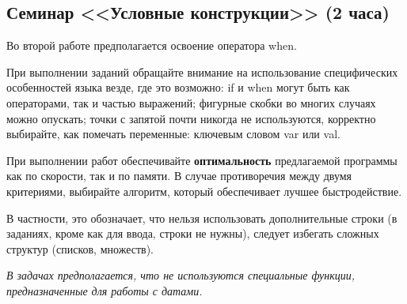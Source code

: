 \subsection{Семинар <<Условные конструкции>> (2 часа)}

Во второй работе предполагается освоение оператора when.

При выполнении заданий обращайте внимание на использование специфических особенностей языка везде, где это возможно: 
if и when могут быть как операторами, так и частью выражений; фигурные скобки во многих случаях можно опускать;
точки с запятой почти никогда не используются, корректно выбирайте, как помечать переменные: ключевым словом var или val.

При выполнении работ обеспечивайте \textbf{оптимальность} предлагаемой программы как по скорости, так и по памяти. В
случае противоречия между двумя критериями, выбирайте алгоритм, который обеспечивает лучшее быстродействие.

В частности, это обозначает, что нельзя использовать дополнительные строки (в заданиях, кроме как для ввода, строки не нужны),
следует избегать сложных структур (списков, множеств). 

\textit {В задачах предполагается, что не используются специальные функции, предназначенные для работы с датами.}

